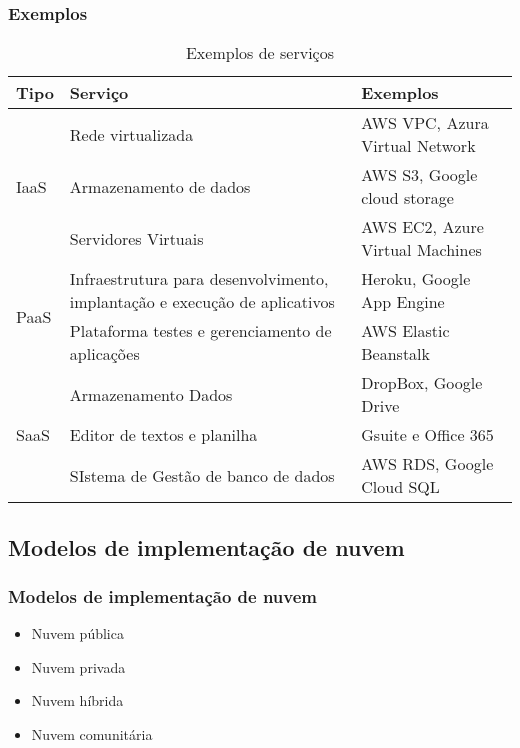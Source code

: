 \begin{frame}
	\frametitle{Exemplos}
	\begin{tiny}
	\begin{table}[ht]
		\centering
		\begin{tabular}{|p{1cm}|p{5cm}|p{4cm}|}
		\hline
			Tipo & Serviço & Exemplos \\
		\hline
		\hline
		  \multirow{3}{*}{IaaS}
			& Rede virtualizada & AWS VPC, Azura Virtual Network \\
			& Armazenamento de dados & AWS S3, Google cloud storage \\
			& Servidores Virtuais & AWS EC2, Azure Virtual Machines \\
			\hline
		  \multirow{2}{*}{PaaS}
			& Infraestrutura para desenvolvimento, implantação e execução de aplicativos & Heroku, Google App Engine \\
			& Plataforma testes e gerenciamento de aplicações & AWS Elastic Beanstalk \\
			\hline
		  \multirow{3}{*}{SaaS}
			& Armazenamento Dados & DropBox, Google Drive \\
			& Editor de textos e planilha & Gsuite e Office 365 \\
			& SIstema de Gestão de banco de dados & AWS RDS, Google Cloud SQL \\
		\hline
		\end{tabular}
		\caption{Exemplos de serviços}
	\end{table}
	\end{tiny}
\end{frame}

\subsection{Modelos de implementação de nuvem}

\begin{frame}
	\frametitle{Modelos de implementação de nuvem}
	\begin{itemize}
		\item Nuvem pública
		\item Nuvem privada
		\item Nuvem híbrida
		\item Nuvem comunitária
	\end{itemize}
\end{frame}

